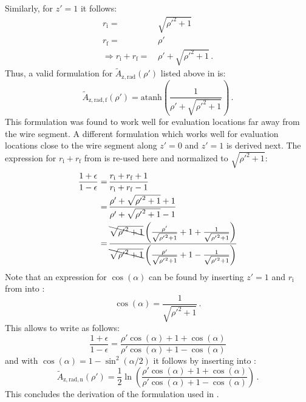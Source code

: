 Similarly, for $z' = 1$ it follows:
\begin{align}
  r_\mathrm{i} =&\, \sqrt{{\rho'}^2 + 1} \label{eqn:ri_for_rad} \\
  r_\mathrm{f} =&\, \rho' \\
  \Rightarrow
  r_\mathrm{i} + r_\mathrm{f} =&\, \rho' + \sqrt{{\rho'}^2 + 1} \label{eqn:riplusrf} \, .
\end{align}
Thus, a valid formulation for $\tilde{A}_\mathrm{z,rad}(\rho')$ listed above in  is:
\begin{equation}
  \tilde{A}_\mathrm{z,rad,f}(\rho') = \textrm{atanh}\left( \frac{1}{\rho' + \sqrt{{\rho'}^2 + 1}} \right) \label{eqn:sws_A_z_rad_f_derivation} \, .
\end{equation}
This formulation was found to work well for evaluation locations far away from the wire segment.
A different formulation which works well for evaluation locations
close to the wire segment along $z' = 0$ and $z' = 1$ is derived next.
The expression for $r_\mathrm{i} + r_\mathrm{f}$ from  is re-used here
and normalized to $\sqrt{{\rho'}^2 + 1}$:
\begin{align}
  \frac{1 + \epsilon}{1 - \epsilon}
  =&\, \frac{r_\mathrm{i} + r_\mathrm{f} + 1}{r_\mathrm{i} + r_\mathrm{f} - 1} \nonumber \\
  =&\, \frac{\rho' + \sqrt{{\rho'}^2 + 1} + 1}{\rho' + \sqrt{{\rho'}^2 + 1} - 1} \nonumber \\
  =&\, \frac{\bcancel{\sqrt{{\rho'}^2 + 1}} \left( \frac{\rho'}{\sqrt{{\rho'}^2 + 1}} + 1 + \frac{1}{\sqrt{{\rho'}^2 + 1}} \right)}
            {\bcancel{\sqrt{{\rho'}^2 + 1}} \left( \frac{\rho'}{\sqrt{{\rho'}^2 + 1}} + 1 - \frac{1}{\sqrt{{\rho'}^2 + 1}} \right)} \label{eqn:opeps_omeps}
\end{align}
Note that an expression for $\cos(\alpha)$ can be found
by inserting $z'=1$ and $r_\mathrm{i}$ from  into :
\begin{equation}
  \cos(\alpha) = \frac{1}{\sqrt{{\rho'}^2 + 1}} \, .
\end{equation}
This allows to write  as follows:
\begin{equation}
  \frac{1 + \epsilon}{1 - \epsilon}
  = \frac{\rho' \cos(\alpha) + 1 + \cos(\alpha)}
         {\rho' \cos(\alpha) + 1 - \cos(\alpha)} \label{eqn:opeps_omeps_slim}
\end{equation}
and with $\cos(\alpha) = 1 - \sin^2(\alpha/2)$ it follows by inserting  into :
\begin{equation}
  \tilde{A}_\mathrm{z,rad,n}(\rho') = \frac{1}{2} \ln \left(
         \frac{\rho' \cos(\alpha) + 1 + \cos(\alpha)}
              {\rho' \cos(\alpha) + 1 - \cos(\alpha)} \right) \label{eqn:sws_A_z_rad_n_derivation} \, .
\end{equation}
This concludes the derivation of the formulation used in .

